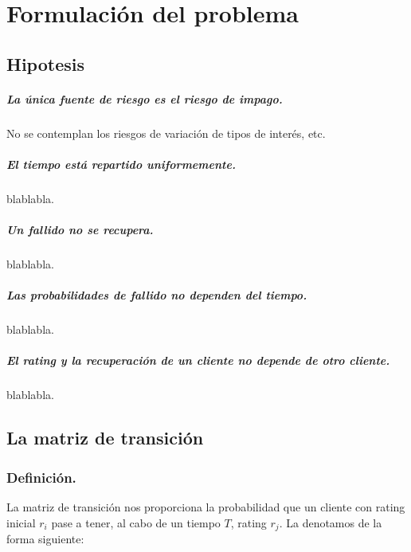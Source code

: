 \chapter{Formulaci\'on del problema}
\label{sec:formulation}

\section{Hipotesis}

\paragraph{La \'unica fuente de riesgo es el riesgo de impago.}
No se contemplan los riesgos de variación de tipos de interés, etc.

\paragraph{El tiempo est\'a repartido uniformemente.}
blablabla.

\paragraph{Un fallido no se recupera.}
blablabla.

\paragraph{Las probabilidades de fallido no dependen del tiempo.}
blablabla.

\paragraph{El rating y la recuperación de un cliente no depende de otro cliente.}
blablabla.



\section{La matriz de transición}

\subsection{Definici\'on.} La matriz de transición nos proporciona la probabilidad 
que un cliente con rating inicial $r_i$ pase a tener, al cabo de un tiempo $T$, 
rating $r_j$. La denotamos de la forma siguiente:

